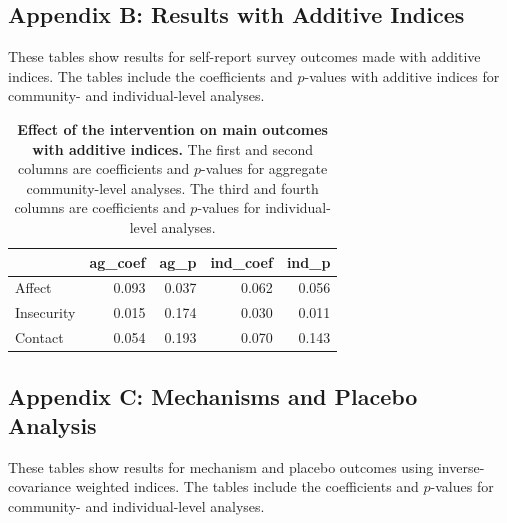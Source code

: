 \documentclass[11pt]{article}
\begin{document}
\hypertarget{appendix-b-results-with-additive-indices}{%
\subsection{Appendix B: Results with Additive
Indices}\label{appendix-b-results-with-additive-indices}}

These tables show results for self-report survey outcomes made with
additive indices. The tables include the coefficients and \(p\)-values
with additive indices for community- and individual-level analyses.

\begin{table}[H]
\begin{center}

\begin{tabular}{l|r|r|r|r}
\hline
  & ag\_coef & ag\_p & ind\_coef & ind\_p\\
\hline
Affect & 0.093 & 0.037 & 0.062 & 0.056\\
\hline
Insecurity & 0.015 & 0.174 & 0.030 & 0.011\\
\hline
Contact & 0.054 & 0.193 & 0.070 & 0.143\\
\hline
\end{tabular}


\caption{\label{tab:add_ind_tab}\textbf{Effect of the intervention on main outcomes with additive indices.} The first and second columns are coefficients and $p$-values for aggregate community-level analyses.  The third and fourth columns are coefficients and $p$-values for individual-level analyses.}
\end{center}
\end{table}

\hypertarget{appendix-c-mechanisms-and-placebo-analysis}{%
\subsection{Appendix C: Mechanisms and Placebo
Analysis}\label{appendix-c-mechanisms-and-placebo-analysis}}

These tables show results for mechanism and placebo outcomes using
inverse-covariance weighted indices. The tables include the coefficients
and \(p\)-values for community- and individual-level analyses.
\end{document}
